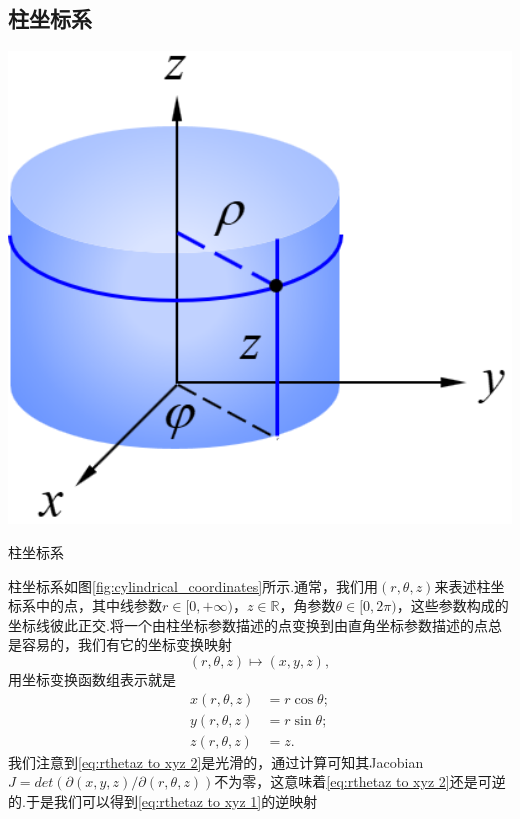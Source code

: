 	\subsection{柱坐标系}
		\begin{marginfigure}
			\centering
			\includegraphics[width=1\textwidth]{figures/cylindrical_coordinates.png}
			\caption{柱坐标系}\label{fig:cylindrical_coordinates}
		\end{marginfigure}
		柱坐标系如图\ref{fig:cylindrical_coordinates}所示.通常，我们用$(r,\theta,z)$来表述柱坐标系中的点，其中线参数$r\in[0,+\infty)$，$z\in \mathbb{R}$，角参数$\theta\in[0,2\pi)$，这些参数构成的坐标线彼此正交.将一个由柱坐标参数描述的点变换到由直角坐标参数描述的点总是容易的，我们有它的坐标变换映射
		\begin{equation}\label{eq:rthetaz to xyz 1}
			(r,\theta,z)\mapsto(x,y,z),
		\end{equation}
		用坐标变换函数组表示就是
		\begin{equation}\label{eq:rthetaz to xyz 2}
			\begin{split}
				x(r,\theta,z)&=r\cos\theta;\\
				y(r,\theta,z)&=r\sin\theta;\\
				z(r,\theta,z)&=z.
			\end{split}
		\end{equation}
		我们注意到\ref{eq:rthetaz to xyz 2}是光滑的，通过计算可知其Jacobian$J=det(\partial(x,y,z)/\partial(r,\theta,z))$不为零，这意味着\ref{eq:rthetaz to xyz 2}还是可逆的.于是我们可以得到\ref{eq:rthetaz to xyz 1}的逆映射
